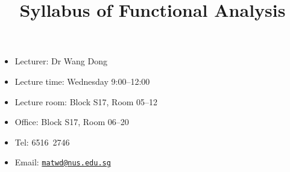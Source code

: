 \documentclass[a4paper]{article}
\title{Syllabus of Functional Analysis}
\date{}
\begin{document}
\maketitle

\begin{minipage}[t]{0.5\linewidth}
  \begin{itemize}[leftmargin=*]
  \item Lecturer: Dr Wang Dong
  \item Lecture time: Wednesday 9:00--12:00
  \item Lecture room: Block S17, Room 05--12
  \end{itemize}
\end{minipage}
\begin{minipage}[t]{0.4\linewidth}
  \begin{itemize}
  \item Office: Block S17, Room 06--20
  \item Tel: 6516\ 2746
  \item Email: \href{mailto:matwd@nus.edu.sg}{\nolinkurl{matwd@nus.edu.sg}}
  \end{itemize}
\end{minipage}
\end{document}
